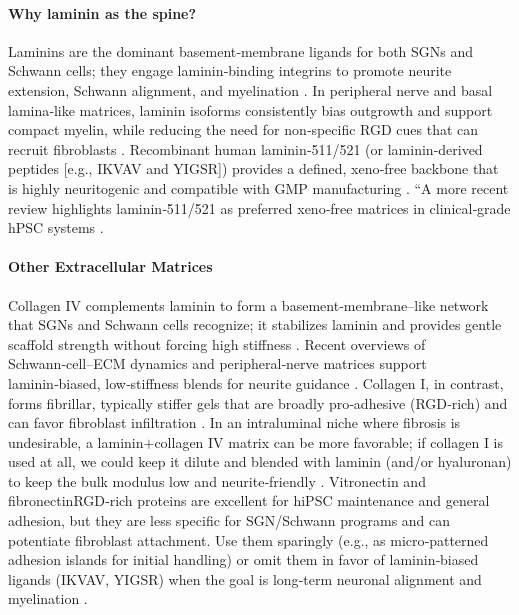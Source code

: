 \documentclass[referee,pdflatex, sn-vancouver-num]{sn-jnl}%
\theoremstyle{thmstyleone}%
\theoremstyle{thmstyletwo}%
\theoremstyle{thmstylethree}%
\begin{document}
\paragraph{Why laminin as the spine?} Laminins are the dominant basement‑membrane ligands for both SGNs and Schwann cells; they engage laminin‑binding integrins to promote neurite extension, Schwann alignment, and myelination \cite{Evans2007LamininFibronectin}. In peripheral nerve and basal lamina‐like matrices, laminin isoforms consistently bias outgrowth and support compact myelin, while reducing the need for non‑specific RGD cues that can recruit fibroblasts \citep{Evans2007LamininFibronectin,Vega1995LamininCollagenIV}. Recombinant human laminin‑511/521 (or laminin‑derived peptides [e.g., IKVAV and YIGSR]) provides a defined, xeno‑free backbone that is highly neuritogenic and compatible with GMP manufacturing \cite{Lu2014XenoFreeIPS}. “A more recent review highlights laminin‑511/521 as preferred xeno‑free matrices in clinical‑grade hPSC systems \cite{Ozawa2023_BiomaterTransl}.

\paragraph{Other Extracellular Matrices}
Collagen IV complements laminin to form a basement‑membrane–like network that SGNs and Schwann cells recognize; it stabilizes laminin and provides gentle scaffold strength without forcing high stiffness \citep{Yurchenco2011BasementMembranes,Yurchenco2009Laminins,Feltri2005LamininsSchwann}. 
Recent overviews of Schwann‑cell–ECM dynamics and peripheral‑nerve matrices support laminin‑biased, low‑stiffness blends for neurite guidance \cite{Jiang2024_EBioMedicine}. Collagen I, in contrast, forms fibrillar, typically stiffer gels that are broadly pro‑adhesive (RGD‑rich) and can favor fibroblast infiltration \citep{Shoulders2009CollagenStability,Hersel2003RGDReview,Frantz2010ECMGlance,Discher2005Stiffness}. In an intraluminal niche where fibrosis is undesirable, a laminin$+$collagen IV matrix can be more favorable; if collagen I is used at all, we could keep it dilute and blended with laminin (and/or hyaluronan) to keep the bulk modulus low and neurite‑friendly \citep{Bonnans2014ECMRemodel,Feltri2005LamininsSchwann}. Vitronectin and fibronectin\textemdash RGD‑rich proteins are excellent for hiPSC maintenance and general adhesion, but they are less specific for SGN/Schwann programs and can potentiate fibroblast attachment. Use them sparingly (e.g., as micro‑patterned adhesion islands for initial handling) or omit them in favor of laminin‑biased ligands (IKVAV, YIGSR) when the goal is long‑term neuronal alignment and myelination \citep{Evans2007LamininFibronectin}. 
\end{document}
